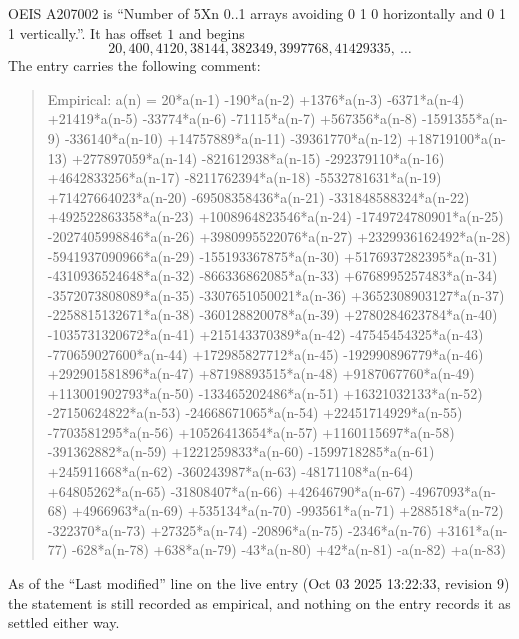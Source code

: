 \documentclass[11pt,a4paper]{article}
\theoremstyle{plain}
\theoremstyle{definition}
\begin{document}
OEIS A207002 is ``Number of 5Xn 0..1 arrays avoiding 0 1 0 horizontally and 0 1 1 vertically.''. It has offset
$1$ and begins
\[
20, 400, 4120, 38144, 382349, 3997768, 41429335,\ \dots
\]
The entry carries the following comment:
\begin{quote}\small
Empirical: a(n) = 20*a(n-1) -190*a(n-2) +1376*a(n-3) -6371*a(n-4) +21419*a(n-5) -33774*a(n-6) -71115*a(n-7) +567356*a(n-8) -1591355*a(n-9) -336140*a(n-10) +14757889*a(n-11) -39361770*a(n-12) +18719100*a(n-13) +277897059*a(n-14) -821612938*a(n-15) -292379110*a(n-16) +4642833256*a(n-17) -8211762394*a(n-18) -5532781631*a(n-19) +71427664023*a(n-20) -69508358436*a(n-21) -331848588324*a(n-22) +492522863358*a(n-23) +1008964823546*a(n-24) -1749724780901*a(n-25) -2027405998846*a(n-26) +3980995522076*a(n-27) +2329936162492*a(n-28) -5941937090966*a(n-29) -155193367875*a(n-30) +5176937282395*a(n-31) -4310936524648*a(n-32) -866336862085*a(n-33) +6768995257483*a(n-34) -3572073808089*a(n-35) -3307651050021*a(n-36) +3652308903127*a(n-37) -2258815132671*a(n-38) -360128820078*a(n-39) +2780284623784*a(n-40) -1035731320672*a(n-41) +215143370389*a(n-42) -47545454325*a(n-43) -770659027600*a(n-44) +172985827712*a(n-45) -192990896779*a(n-46) +292901581896*a(n-47) +87198893515*a(n-48) +9187067760*a(n-49) +113001902793*a(n-50) -133465202486*a(n-51) +16321032133*a(n-52) -27150624822*a(n-53) -24668671065*a(n-54) +22451714929*a(n-55) -7703581295*a(n-56) +10526413654*a(n-57) +1160115697*a(n-58) -391362882*a(n-59) +1221259833*a(n-60) -1599718285*a(n-61) +245911668*a(n-62) -360243987*a(n-63) -48171108*a(n-64) +64805262*a(n-65) -31808407*a(n-66) +42646790*a(n-67) -4967093*a(n-68) +4966963*a(n-69) +535134*a(n-70) -993561*a(n-71) +288518*a(n-72) -322370*a(n-73) +27325*a(n-74) -20896*a(n-75) -2346*a(n-76) +3161*a(n-77) -628*a(n-78) +638*a(n-79) -43*a(n-80) +42*a(n-81) -a(n-82) +a(n-83)
\end{quote}
As of the ``Last modified'' line on the live entry (Oct 03 2025 13:22:33, revision
9) the statement is still recorded as empirical, and nothing on the entry
records it as settled either way.
\end{document}
